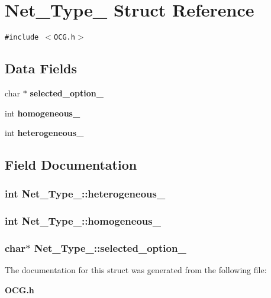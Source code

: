 \section{Net\_\-Type\_\- Struct Reference}
\label{structNet__Type__}
{\tt \#include $<$OCG.h$>$}

\subsection*{Data Fields}
\begin{CompactItemize}
\item 
char $\ast$ {\bf selected\_\-option\_\-}
\item 
int {\bf homogeneous\_\-}
\item 
int {\bf heterogeneous\_\-}
\end{CompactItemize}


\subsection{Field Documentation}
\subsubsection[{heterogeneous\_\-}]{\setlength{\rightskip}{0pt plus 5cm}int {\bf Net\_\-Type\_\-::heterogeneous\_\-}}\label{structNet__Type___a05895c5c927a1b6e83b13ed30db2b39}


\subsubsection[{homogeneous\_\-}]{\setlength{\rightskip}{0pt plus 5cm}int {\bf Net\_\-Type\_\-::homogeneous\_\-}}\label{structNet__Type___45b1c2af4e8ced59a9ce6f7f20b2d787}


\subsubsection[{selected\_\-option\_\-}]{\setlength{\rightskip}{0pt plus 5cm}char$\ast$ {\bf Net\_\-Type\_\-::selected\_\-option\_\-}}\label{structNet__Type___0710e13dc0c6adbed8bdd89095f25629}




The documentation for this struct was generated from the following file:\begin{CompactItemize}
\item 
{\bf OCG.h}\end{CompactItemize}
